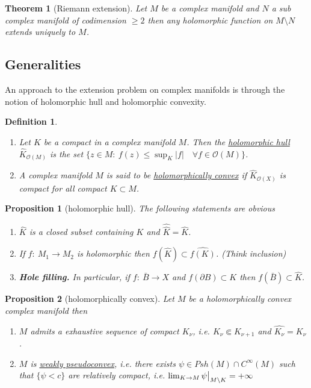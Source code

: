 \documentclass[11pt]{article}
\newtheorem{theorem}{Theorem}
\newtheorem{proposition}{Proposition}[theorem]
\newtheorem{definition}{Definition}
\newcommand\restr[2]{{%
\left.\kern-\nulldelimiterspace %
#1 %
\vphantom{\big|} %
\right|_{#2} %
}}
\begin{document}
\begin{theorem}[Riemann extension]
\label{thm:riemann-ext}
Let \(M\) be a complex manifold and \(N\) a sub complex manifold of codimension \(\geq 2\) then any holomorphic function on \(M\setminus N\) extends uniquely to \(M\).
\end{theorem}

\subsection{Generalities}
\label{sec:org1f125b4}
An approach to the extension problem on complex manifolds is through the notion of holomorphic hull and holomorphic convexity.

\begin{definition}
\begin{enumerate}
\item Let \(K\) be a compact in a complex manifold \(M\). Then the \uline{holomorphic hull} \(\hat K_{\mathcal{O}(M)}\) is the set \(\{ z\in M:\ f(z) \leq \sup_K |f| \quad\forall
  f\in \mathcal{O}(M) \}\).
\item A complex manifold \(M\) is said to be \uline{holomorphically convex} if \(\hat
   K_{\mathcal{O}(X)}\) is compact for all compact \(K\subset M\).
\end{enumerate}
\end{definition}


\begin{proposition}[holomorphic hull]
\label{prop:holo-hull}
The following statements are obvious
\begin{enumerate}
\item \(\hat K\) is a closed subset containing \(K\) and \(\hat{\hat K} = \hat K\).
\item If \(f:\ M_1 \longrightarrow  M_2\) is holomorphic then \(f(\hat K)\subset
   \widehat{f(K)}\). \emph{(Think inclusion)}
\item \textbf{Hole filling.} In particular, if \(f:\ \bar B \longrightarrow X\) and \(f(\partial
   B) \subset K\) then \(f(\bar B)\subset \hat K\).
\end{enumerate}
\end{proposition}

\begin{proposition}[holomorphically convex]
\label{prop:holo-convex}
Let \(M\) be a holomorphically convex complex manifold then
\begin{enumerate}
\item \(M\) admits a exhaustive sequence of compact \(K_\nu\), i.e. \(K_\nu \Subset
   K_{\nu+1}\) and \(\widehat {K_\nu} = K_\nu\).
\item \(M\) is \uline{weakly pseudoconvex}, i.e. there exists \(\psi\in Psh(M)\cap C^\infty(M)\) such that \(\{\psi<c\}\) are relatively compact, i.e. \(\lim_{K\to M}
   \restr{\psi}{M\setminus K} = +\infty\)
\end{enumerate}
\end{proposition}
\end{document}
